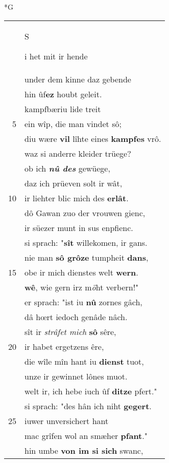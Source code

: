 \documentclass[8pt,a4paper,notitlepage]{article}
\begin{document}
\begin{table}[ht]
\begin{minipage}[t]{0.5\linewidth}
\small
\begin{center}*G
\end{center}
\begin{tabular}{rl}
 & \begin{large}S\end{large}i het mit ir hende\\ 
 & under dem kinne daz gebende\\ 
 & hin ûf\textbf{ez} houbt geleit.\\ 
 & kampfbæriu lide treit\\ 
5 & ein wîp, die man vindet sô;\\ 
 & diu wære \textbf{vil} lîhte eines \textbf{kampfes} vrô.\\ 
 & waz si anderre kleider trüege?\\ 
 & ob ich \textit{\textbf{nû des}} gewüege,\\ 
 & daz ich prüeven solt ir wât,\\ 
10 & ir liehter blic mich des \textbf{erlât}.\\ 
 & dô Gawan zuo der vrouwen gienc,\\ 
 & ir süezer munt in sus enpfienc.\\ 
 & si sprach: "\textbf{sît} willekomen, ir gans.\\ 
 & nie man \textbf{sô grôze} tumpheit \textbf{dans},\\ 
15 & obe ir mich dienstes welt \textbf{wern}.\\ 
 & \textbf{wê}, wie gern irz m\textit{ö}ht verbern!"\\ 
 & er sprach: "ist iu \textbf{nû} zornes gâch,\\ 
 & dâ hœrt iedoch genâde nâch.\\ 
 & sît ir \textit{strâfet mich} \textbf{sô} sêre,\\ 
20 & ir habet ergetzens êre,\\ 
 & die wîle mîn hant iu \textbf{dienst} tuot,\\ 
 & unze ir gewinnet lônes muot.\\ 
 & welt ir, ich hebe iuch ûf \textbf{ditze} pfert."\\ 
 & si sprach: "des hân ich niht \textbf{gegert}.\\ 
25 & iuwer unversichert hant\\ 
 & mac grîfen wol an smæher \textbf{pfant}."\\ 
 & hin umbe \textbf{von im si sich} swanc,\\ 

\end{tabular}
\end{minipage}
\end{table}
\end{document}
